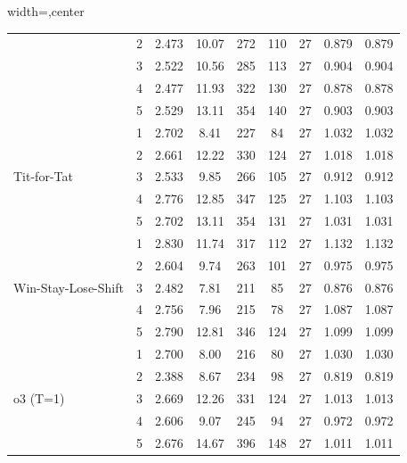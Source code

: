 \begin{table}[htbp]
\begin{adjustbox}{width=\textwidth,center}
\begin{tabular}{|l|c|c|c|c|c|c|c|c|}
 & 
2 & 
2.473 & 
10.07 & 
272 & 
110 & 
27 & 
0.879 & 
0.879 \\
 & 
3 & 
2.522 & 
10.56 & 
285 & 
113 & 
27 & 
0.904 & 
0.904 \\
 & 
4 & 
2.477 & 
11.93 & 
322 & 
130 & 
27 & 
0.878 & 
0.878 \\
 & 
5 & 
2.529 & 
13.11 & 
354 & 
140 & 
27 & 
0.903 & 
0.903 \\
\hline
\multirow{5}{*}{Tit-for-Tat} & 
1 & 
2.702 & 
8.41 & 
227 & 
84 & 
27 & 
1.032 & 
1.032 \\
 & 
2 & 
2.661 & 
12.22 & 
330 & 
124 & 
27 & 
1.018 & 
1.018 \\
 & 
3 & 
2.533 & 
9.85 & 
266 & 
105 & 
27 & 
0.912 & 
0.912 \\
 & 
4 & 
2.776 & 
12.85 & 
347 & 
125 & 
27 & 
1.103 & 
1.103 \\
 & 
5 & 
2.702 & 
13.11 & 
354 & 
131 & 
27 & 
1.031 & 
1.031 \\
\hline
\multirow{5}{*}{Win-Stay-Lose-Shift} & 
1 & 
2.830 & 
11.74 & 
317 & 
112 & 
27 & 
1.132 & 
1.132 \\
 & 
2 & 
2.604 & 
9.74 & 
263 & 
101 & 
27 & 
0.975 & 
0.975 \\
 & 
3 & 
2.482 & 
7.81 & 
211 & 
85 & 
27 & 
0.876 & 
0.876 \\
 & 
4 & 
2.756 & 
7.96 & 
215 & 
78 & 
27 & 
1.087 & 
1.087 \\
 & 
5 & 
2.790 & 
12.81 & 
346 & 
124 & 
27 & 
1.099 & 
1.099 \\
\hline
\multirow{5}{*}{o3 (T=1)} & 
1 & 
2.700 & 
8.00 & 
216 & 
80 & 
27 & 
1.030 & 
1.030 \\
 & 
2 & 
2.388 & 
8.67 & 
234 & 
98 & 
27 & 
0.819 & 
0.819 \\
 & 
3 & 
2.669 & 
12.26 & 
331 & 
124 & 
27 & 
1.013 & 
1.013 \\
 & 
4 & 
2.606 & 
9.07 & 
245 & 
94 & 
27 & 
0.972 & 
0.972 \\
 & 
5 & 
2.676 & 
14.67 & 
396 & 
148 & 
27 & 
1.011 & 
1.011 \\
\hline
\end{tabular}
\end{adjustbox}
\end{table}

\clearpage


